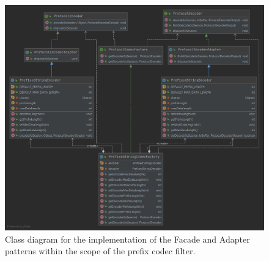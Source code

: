 \begin{figure}
    \centering
    \includegraphics[width = \textwidth]{images/class_diagrams/adapter_facade_pattern.png}
    \caption{Class diagram for the implementation of the Facade and Adapter patterns within the scope of the prefix codec filter.}
    \label{fig:cd_facade}
\end{figure}

